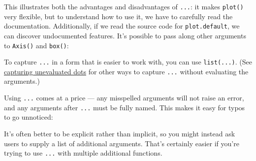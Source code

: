 This illustrates both the advantages and disadvantages of \texttt{...}:
it makes \texttt{plot()} very flexible, but to understand how to use it,
we have to carefully read the documentation. Additionally, if we read
the source code for \texttt{plot.default}, we can discover undocumented
features. It's possible to pass along other arguments to \texttt{Axis()}
and \texttt{box()}:

\begin{Shaded}
\begin{Highlighting}[]
\NormalTok{(}\NormalTok{:}\NormalTok{, } \NormalTok{)}
\NormalTok{(}\NormalTok{:}\NormalTok{, } \NormalTok{)}
\end{Highlighting}
\end{Shaded}

To capture \texttt{...} in a form that is easier to work with, you can
use \texttt{list(...)}. (See \hyperref[capturing-dots]{capturing
unevaluated dots} for other ways to capture \texttt{...} without
evaluating the arguments.)

\begin{Shaded}
\begin{Highlighting}[]
\StringTok{ }
  \NormalTok{(}
\NormalTok{\}}
\NormalTok{(} \NormalTok{, } \NormalTok{)}
\end{Highlighting}
\end{Shaded}

Using \texttt{...} comes at a price --- any misspelled arguments will
not raise an error, and any arguments after \texttt{...} must be fully
named. This makes it easy for typos to go unnoticed:

\begin{Shaded}
\begin{Highlighting}[]
\NormalTok{(}\NormalTok{, }\NormalTok{, }\NormalTok{, } \NormalTok{)}
\end{Highlighting}
\end{Shaded}

It's often better to be explicit rather than implicit, so you might
instead ask users to supply a list of additional arguments. That's
certainly easier if you're trying to use \texttt{...} with multiple
additional functions.

